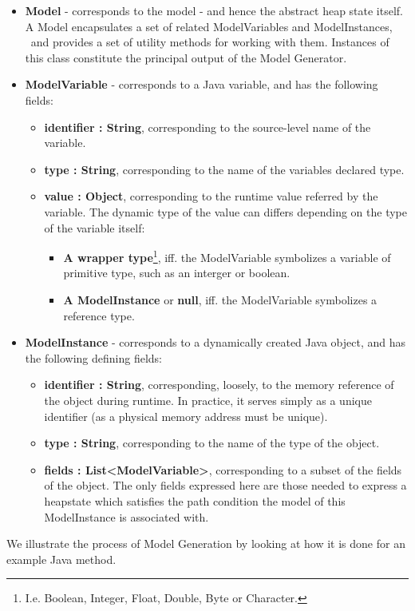 \documentclass{article}
\newcommand{\tmstrong}[1]{\textbf{#1}}
\newenvironment{itemizearrow}{\begin{itemize} \renewcommand{\labelitemi}{$\rightarrow$}\renewcommand{\labelitemii}{$\rightarrow$}\renewcommand{\labelitemiii}{$\rightarrow$}\renewcommand{\labelitemiv}{$\rightarrow$}}{\end{itemize}}
\newenvironment{itemizedot}{\begin{itemize} \renewcommand{\labelitemi}{$\bullet$}\renewcommand{\labelitemii}{$\bullet$}\renewcommand{\labelitemiii}{$\bullet$}\renewcommand{\labelitemiv}{$\bullet$}}{\end{itemize}}
\newenvironment{itemizeminus}{\begin{itemize} \renewcommand{\labelitemi}{$-$}\renewcommand{\labelitemii}{$-$}\renewcommand{\labelitemiii}{$-$}\renewcommand{\labelitemiv}{$-$}}{\end{itemize}}
\begin{document}
\begin{itemizedot}
  \item {\tmstrong{Model}} - corresponds to the model - and hence the abstract
  heap state itself. A Model encapsulates a set of related ModelVariables and
  ModelInstances, \ and provides a set of utility methods for working with
  them. Instances of this class constitute the principal output of the Model
  Generator.
  
  \item {\tmstrong{ModelVariable}} - corresponds to a Java variable, and has
  the following fields:
  \begin{itemizeminus}
    \item {\tmstrong{identifier : String}}, corresponding to the source-level
    name of the variable.
    
    \item {\tmstrong{type : String}}, corresponding to the name of the
    variables declared type.
    
    \item {\tmstrong{value : Object}}, corresponding to the runtime value
    referred by the variable. The dynamic type of the value can differs
    depending on the type of the variable itself:
    \begin{itemizearrow}
      \item {\tmstrong{A wrapper type}}{\footnote{I.e. Boolean, Integer,
      Float, Double, Byte or Character.}}, iff. the ModelVariable symbolizes a
      variable of primitive type, such as an interger or boolean.
      
      \item {\tmstrong{A ModelInstance}} or {\tmstrong{null}}, iff. the
      ModelVariable symbolizes a reference type.
    \end{itemizearrow}
  \end{itemizeminus}
  \item {\tmstrong{ModelInstance}} - corresponds to a dynamically created Java
  object, and has the following defining fields:
  \begin{itemizeminus}
    \item {\tmstrong{identifier : String}}, corresponding, loosely, to the
    memory reference of the object during runtime. In practice, it serves
    simply as a unique identifier (as a physical memory address must be
    unique).
    
    \item {\tmstrong{type : String}}, corresponding to the name of the type of
    the object.
    
    \item {\tmstrong{fields : List<ModelVariable>}}, corresponding to a subset
    of the fields of the object. The only fields expressed here are those
    needed to express a heapstate which satisfies the path condition the model
    of this ModelInstance is associated with.
    
    
  \end{itemizeminus}
\end{itemizedot}
We illustrate the process of Model Generation by looking at how it is done for
an example Java method.
\end{document}
